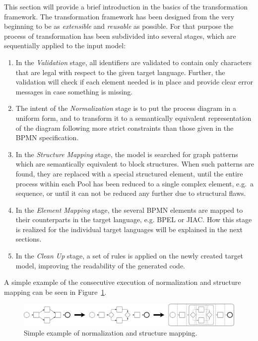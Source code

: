 This section will provide a brief introduction in the basics of the transformation
framework.  The transformation framework has been designed from the very beginning
to be as \emph{extensible} and \emph{reusable} as possible.  For that purpose the
process of transformation has been subdivided into several stages, which are
sequentially applied to the input model:
\begin{enumerate}
	\item In the \emph{Validation} stage, all identifiers are validated to contain
	only characters that are legal with respect to the given target language.
	Further, the validation will check if each element needed is in place and
	provide clear error messages in case something is missing.
	
	\item The intent of the \emph{Normalization} stage is to put the process
	diagram in a uniform form, and to transform it to a semantically equivalent
	representation of the diagram following more strict constraints than those
	given in the BPMN specification.
	
	\item In the \emph{Structure Mapping} stage, the model is searched for graph
	patterns which are semantically equivalent to block structures.  When such
	patterns are found, they are replaced with a special structured element, until
	the entire process within each Pool has been reduced to a single complex
	element, e.g.\ a sequence, or until it can not be reduced any further due to
	structural flaws.
	
	\item In the \emph{Element Mapping} stage, the several BPMN elements are
	mapped to their counterparts in the target language, e.g. BPEL or JIAC. How
	this stage is realized for the individual target languages will be explained
	in the next sections.
	
	\item In the \emph{Clean Up} stage, a set of rules is applied on the newly
	created target model, improving the readability of the generated code.
\end{enumerate}

A simple example of the consecutive execution of normalization and structure
mapping can be seen in Figure~\ref{fig:norm_struc}.

\begin{figure}[ht]
	\centering
	\includegraphics[width=\textwidth]{figures/trafo/norm_struc.pdf}
	\caption{Simple example of normalization and structure mapping.}
	\label{fig:norm_struc}
\end{figure}


